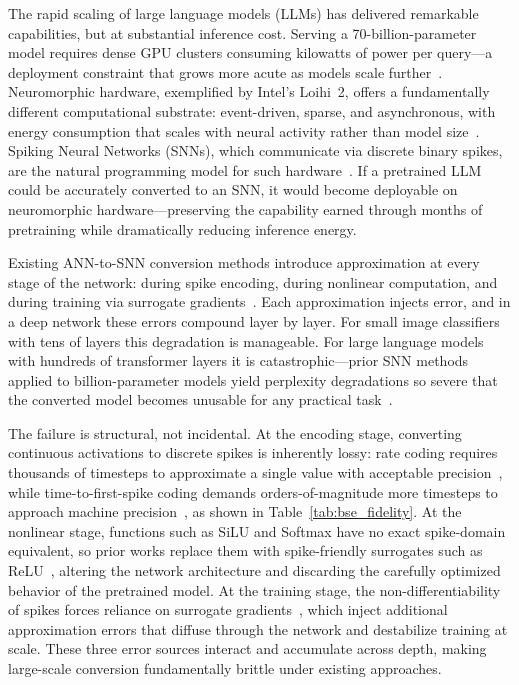 \documentclass{article}
\theoremstyle{plain}
\theoremstyle{definition}
\theoremstyle{remark}
\begin{document}
The rapid scaling of large language models (LLMs) has delivered remarkable capabilities, but at substantial inference cost. Serving a 70-billion-parameter model requires dense GPU clusters consuming kilowatts of power per query—a deployment constraint that grows more acute as models scale further~\citep{tay2022efficient}. Neuromorphic hardware, exemplified by Intel's Loihi~2, offers a fundamentally different computational substrate: event-driven, sparse, and asynchronous, with energy consumption that scales with neural activity rather than model size~\citep{davies2018loihi,davies2021loihi}. Spiking Neural Networks (SNNs),
which communicate via discrete binary spikes, are the natural programming model for such hardware~\citep{maass1997networks,roy2019towards}. If a pretrained LLM could be accurately converted to an SNN, it would become deployable on neuromorphic hardware—preserving the capability earned through months of pretraining while dramatically reducing inference energy.

Existing ANN-to-SNN conversion methods introduce approximation at every stage of the
network: during spike encoding, during nonlinear computation, and during training via
surrogate gradients~\citep{neftci2019surrogate,wu2018stbp,rueckauer2017conversion}.
Each approximation injects error, and in a deep network these errors compound layer by
layer. For small image classifiers with tens of layers this degradation is manageable.
For large language models with hundreds of transformer layers it is catastrophic---prior SNN methods applied to billion-parameter models yield perplexity degradations so severe that the converted model becomes unusable for any practical task~\citep{xing2025spikellm}.

The failure is structural, not incidental. At the encoding stage, converting continuous activations to discrete spikes is inherently lossy: rate coding requires thousands of timesteps to approximate a single value with acceptable
precision~\citep{rueckauer2017conversion,auge2021encoding}, while time-to-first-spike
coding demands orders-of-magnitude more timesteps to approach machine precision~\citep{bonilla2022ttfs,stanojevic2024ttfs}, as shown in
Table~\ref{tab:bse_fidelity}. At the nonlinear stage, functions such as SiLU and
Softmax have no exact spike-domain equivalent, so prior works replace them with
spike-friendly surrogates such as
ReLU~\citep{zhou2023spikformer,yao2023sdt,spikedattention2024}, altering the network
architecture and discarding the carefully optimized behavior of the pretrained model.
At the training stage, the non-differentiability of spikes forces reliance on surrogate gradients~\citep{neftci2019surrogate,shrestha2018slayer,deng2022tet}, which inject additional approximation errors that diffuse through the network and destabilize training at scale. These three error sources interact and accumulate across depth, making large-scale conversion fundamentally brittle under existing approaches.
\end{document}
